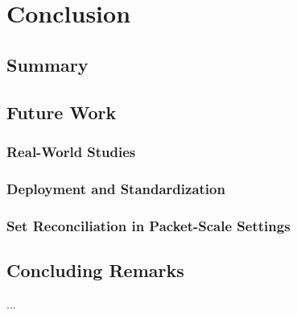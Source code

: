 \chapter{Conclusion}
\section{Summary}
\section{Future Work}

\subsection{Real-World Studies}
\subsection{Deployment and Standardization}
\subsection{Set Reconciliation in Packet-Scale Settings}

\section{Concluding Remarks}
...